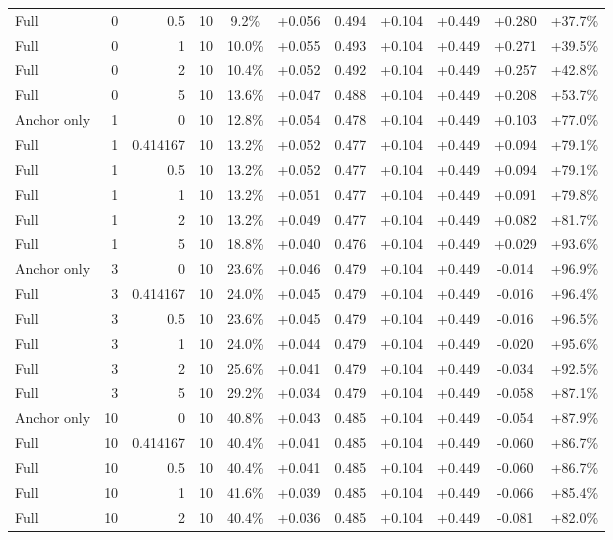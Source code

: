 \begin{table}[htbp]
\begin{tabular}{lrrrccccccc}
Full & 0 & 0.5 & 10 & 9.2\% & +0.056 & 0.494 & +0.104 & +0.449 & +0.280 & +37.7\% \\
Full & 0 & 1 & 10 & 10.0\% & +0.055 & 0.493 & +0.104 & +0.449 & +0.271 & +39.5\% \\
Full & 0 & 2 & 10 & 10.4\% & +0.052 & 0.492 & +0.104 & +0.449 & +0.257 & +42.8\% \\
Full & 0 & 5 & 10 & 13.6\% & +0.047 & 0.488 & +0.104 & +0.449 & +0.208 & +53.7\% \\
Anchor only & 1 & 0 & 10 & 12.8\% & +0.054 & 0.478 & +0.104 & +0.449 & +0.103 & +77.0\% \\
Full & 1 & 0.414167 & 10 & 13.2\% & +0.052 & 0.477 & +0.104 & +0.449 & +0.094 & +79.1\% \\
Full & 1 & 0.5 & 10 & 13.2\% & +0.052 & 0.477 & +0.104 & +0.449 & +0.094 & +79.1\% \\
Full & 1 & 1 & 10 & 13.2\% & +0.051 & 0.477 & +0.104 & +0.449 & +0.091 & +79.8\% \\
Full & 1 & 2 & 10 & 13.2\% & +0.049 & 0.477 & +0.104 & +0.449 & +0.082 & +81.7\% \\
Full & 1 & 5 & 10 & 18.8\% & +0.040 & 0.476 & +0.104 & +0.449 & +0.029 & +93.6\% \\
Anchor only & 3 & 0 & 10 & 23.6\% & +0.046 & 0.479 & +0.104 & +0.449 & -0.014 & +96.9\% \\
Full & 3 & 0.414167 & 10 & 24.0\% & +0.045 & 0.479 & +0.104 & +0.449 & -0.016 & +96.4\% \\
Full & 3 & 0.5 & 10 & 23.6\% & +0.045 & 0.479 & +0.104 & +0.449 & -0.016 & +96.5\% \\
Full & 3 & 1 & 10 & 24.0\% & +0.044 & 0.479 & +0.104 & +0.449 & -0.020 & +95.6\% \\
Full & 3 & 2 & 10 & 25.6\% & +0.041 & 0.479 & +0.104 & +0.449 & -0.034 & +92.5\% \\
Full & 3 & 5 & 10 & 29.2\% & +0.034 & 0.479 & +0.104 & +0.449 & -0.058 & +87.1\% \\
Anchor only & 10 & 0 & 10 & 40.8\% & +0.043 & 0.485 & +0.104 & +0.449 & -0.054 & +87.9\% \\
Full & 10 & 0.414167 & 10 & 40.4\% & +0.041 & 0.485 & +0.104 & +0.449 & -0.060 & +86.7\% \\
Full & 10 & 0.5 & 10 & 40.4\% & +0.041 & 0.485 & +0.104 & +0.449 & -0.060 & +86.7\% \\
Full & 10 & 1 & 10 & 41.6\% & +0.039 & 0.485 & +0.104 & +0.449 & -0.066 & +85.4\% \\
Full & 10 & 2 & 10 & 40.4\% & +0.036 & 0.485 & +0.104 & +0.449 & -0.081 & +82.0\% \\

\end{tabular}
\end{table}
